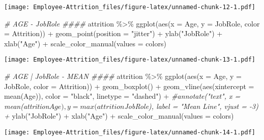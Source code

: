 \documentclass[
]{article}
\newenvironment{Shaded}{\begin{snugshade}}{\end{snugshade}}
\newcommand{\AttributeTok}[1]{\textcolor[rgb]{0.77,0.63,0.00}{#1}}
\newcommand{\CommentTok}[1]{\textcolor[rgb]{0.56,0.35,0.01}{\textit{#1}}}
\newcommand{\FunctionTok}[1]{\textcolor[rgb]{0.00,0.00,0.00}{#1}}
\newcommand{\NormalTok}[1]{#1}
\newcommand{\SpecialCharTok}[1]{\textcolor[rgb]{0.00,0.00,0.00}{#1}}
\newcommand{\StringTok}[1]{\textcolor[rgb]{0.31,0.60,0.02}{#1}}
\begin{document}
\texttt{[image: Employee-Attrition\_files/figure-latex/unnamed-chunk-12-1.pdf]}

\begin{Shaded}
\begin{Highlighting}[]
\CommentTok{\# AGE {-} JobRole \#\#\#\#}
\NormalTok{attrition }\SpecialCharTok{\%\textgreater{}\%} \FunctionTok{ggplot}\NormalTok{(}\FunctionTok{aes}\NormalTok{(}\AttributeTok{x =}\NormalTok{ Age, }\AttributeTok{y =}\NormalTok{ JobRole, }\AttributeTok{color =}\NormalTok{ Attrition)) }\SpecialCharTok{+}
  \FunctionTok{geom\_point}\NormalTok{(}\AttributeTok{position =} \StringTok{"jitter"}\NormalTok{) }\SpecialCharTok{+}
  \FunctionTok{ylab}\NormalTok{(}\StringTok{"JobRole"}\NormalTok{) }\SpecialCharTok{+}
  \FunctionTok{xlab}\NormalTok{(}\StringTok{"Age"}\NormalTok{) }\SpecialCharTok{+}
  \FunctionTok{scale\_color\_manual}\NormalTok{(}\AttributeTok{values =}\NormalTok{ colors)}
\end{Highlighting}
\end{Shaded}

\texttt{[image: Employee-Attrition\_files/figure-latex/unnamed-chunk-13-1.pdf]}

\begin{Shaded}
\begin{Highlighting}[]
\CommentTok{\# AGE | JobRole {-} MEAN \#\#\#\#}
\NormalTok{attrition }\SpecialCharTok{\%\textgreater{}\%} \FunctionTok{ggplot}\NormalTok{(}\FunctionTok{aes}\NormalTok{(}\AttributeTok{x =}\NormalTok{ Age, }\AttributeTok{y =}\NormalTok{ JobRole, }\AttributeTok{color =}\NormalTok{ Attrition)) }\SpecialCharTok{+}
  \FunctionTok{geom\_boxplot}\NormalTok{() }\SpecialCharTok{+}
  \FunctionTok{geom\_vline}\NormalTok{(}\FunctionTok{aes}\NormalTok{(}\AttributeTok{xintercept =} \FunctionTok{mean}\NormalTok{(Age)), }\AttributeTok{color =} \StringTok{"black"}\NormalTok{, }\AttributeTok{linetype =} \StringTok{"dashed"}\NormalTok{) }\SpecialCharTok{+}
  \CommentTok{\#annotate("text", x = mean(attrition$Age), y = max(attrition$JobRole), label = "Mean Line", vjust = {-}3) +}
  \FunctionTok{ylab}\NormalTok{(}\StringTok{"JobRole"}\NormalTok{) }\SpecialCharTok{+}
  \FunctionTok{xlab}\NormalTok{(}\StringTok{"Age"}\NormalTok{) }\SpecialCharTok{+}
  \FunctionTok{scale\_color\_manual}\NormalTok{(}\AttributeTok{values =}\NormalTok{ colors)}
\end{Highlighting}
\end{Shaded}

\texttt{[image: Employee-Attrition\_files/figure-latex/unnamed-chunk-14-1.pdf]}
\end{document}
